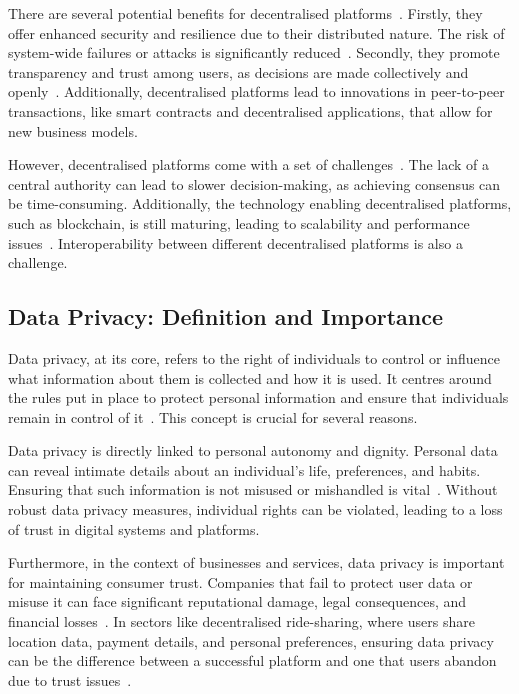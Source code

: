 There are several potential benefits for decentralised platforms~\cite{Hasan.2022}. Firstly, they offer enhanced security and resilience due to their distributed nature. The risk of system-wide failures or attacks is significantly reduced~\cite{Maffiola.2022}. Secondly, they promote transparency and trust among users, as decisions are made collectively and openly~\cite{Hasan.2022}. Additionally, decentralised platforms lead to innovations in peer-to-peer transactions, like smart contracts and decentralised applications, that allow for new business models.

However, decentralised platforms come with a set of challenges~\cite{Hasan.2022}. The lack of a central authority can lead to slower decision-making, as achieving consensus can be time-consuming. Additionally, the technology enabling decentralised platforms, such as blockchain, is still maturing, leading to scalability and performance issues~\cite{Hasan.2022}. Interoperability between different decentralised platforms is also a challenge.

\subsection{Data Privacy: Definition and Importance}
Data privacy, at its core, refers to the right of individuals to control or influence what information about them is collected and how it is used. It centres around the rules put in place to protect personal information and ensure that individuals remain in control of it~\cite{Covert.2020}. This concept is crucial for several reasons.

Data privacy is directly linked to personal autonomy and dignity. Personal data can reveal intimate details about an individual's life, preferences, and habits. Ensuring that such information is not misused or mishandled is vital~\cite{Covert.2020}. Without robust data privacy measures, individual rights can be violated, leading to a loss of trust in digital systems and platforms.

Furthermore, in the context of businesses and services, data privacy is important for maintaining consumer trust. Companies that fail to protect user data or misuse it can face significant reputational damage, legal consequences, and financial losses~\cite{Li.2019}. In sectors like decentralised ride-sharing, where users share location data, payment details, and personal preferences, ensuring data privacy can be the difference between a successful platform and one that users abandon due to trust issues~\cite{Li.2019}.

